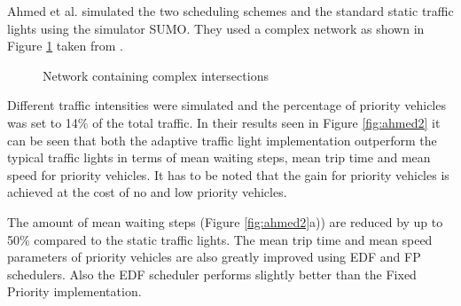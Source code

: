 \documentclass{sig-alternate}
\begin{document}
Ahmed et al. simulated the two scheduling schemes and the standard static traffic lights using the simulator SUMO\cite{sumo}. They used a complex network as shown in Figure \ref{fig:ahmed1} taken from \cite{6799827}. 
\begin{figure} 
\centering
{}
\caption{Network containing complex intersections}
\label{fig:ahmed1}
\end{figure}
Different traffic intensities were simulated and the percentage of priority vehicles was set to 14\% of the total traffic. In their results seen in Figure \ref{fig:ahmed2} it can be seen that both the adaptive traffic light implementation outperform the typical traffic lights in terms of mean waiting steps, mean trip time and mean speed for priority vehicles. It has to be noted that the gain for priority vehicles is achieved at the cost of no and low priority vehicles. 
\begin{figure*} 
\centering
{}
\caption{Simulation results for a network of complex intersections using FP, EDF and static scheduler}
\label{fig:ahmed2}
\end{figure*}
The amount of mean waiting steps (Figure \ref{fig:ahmed2}a)) are reduced by up to 50\% compared to the static traffic lights. The mean trip time and mean speed parameters of priority vehicles are also greatly improved using EDF and FP schedulers. Also the EDF scheduler performs slightly better than the Fixed Priority implementation.\\ 
\end{document}
